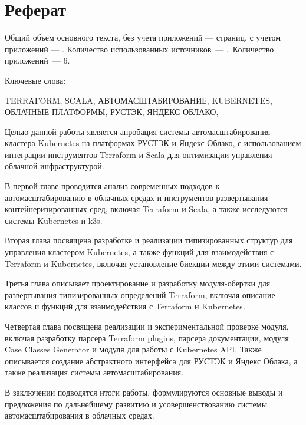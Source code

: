 \chapter*{Реферат}
\thispagestyle{plain}

Общий объем основного текста, без учета приложений ---
\pageref{end_of_main_text} страниц, с учетом приложений ---
\pageref{end_of_document}. Количество использованных источников~--- \thetotalcitations.\ 
Количество приложений~--- 6.

Ключевые слова:

\noindent \uppercase{
terraform,
scala,
автомасштабирование,
kubernetes,
облачные платформы,
РУСТЭК,
Яндекс Облако,
}

Целью данной работы является апробация системы автомасштабирования кластера
Kubernetes на платформах РУСТЭК и Яндекс Облако, с использованием интеграции
инструментов Terraform и Scala для оптимизации управления облачной
инфраструктурой.

В первой главе проводится анализ современных подходов к автомасштабированию в
облачных средах и инструментов развертывания контейнеризированных сред, включая
Terraform и Scala, а также исследуются системы Kubernetes и k3s.

Вторая глава посвящена разработке и реализации типизированных структур для
управления кластером Kubernetes, а также функций для взаимодействия с Terraform
и Kubernetes, включая установление биекции между этими системами.

Третья глава описывает проектирование и разработку модуля-обертки для
развертывания типизированных определений Terraform, включая описание классов и
функций для взаимодействия с Terraform и Kubernetes.

Четвертая глава посвящена реализации и экспериментальной проверке модуля,
включая разработку парсера Terraform plugins, парсера документации, модуля Case
Classes Generator и модуля для работы с Kubernetes API. Также описывается
создание абстрактного интерфейса для РУСТЭК и Яндекс Облака, а также реализация
системы автомасштабирования.

В заключении подводятся итоги работы, формулируются основные выводы и
предложения по дальнейшему развитию и усовершенствованию системы
автомасштабирования в облачных средах.


